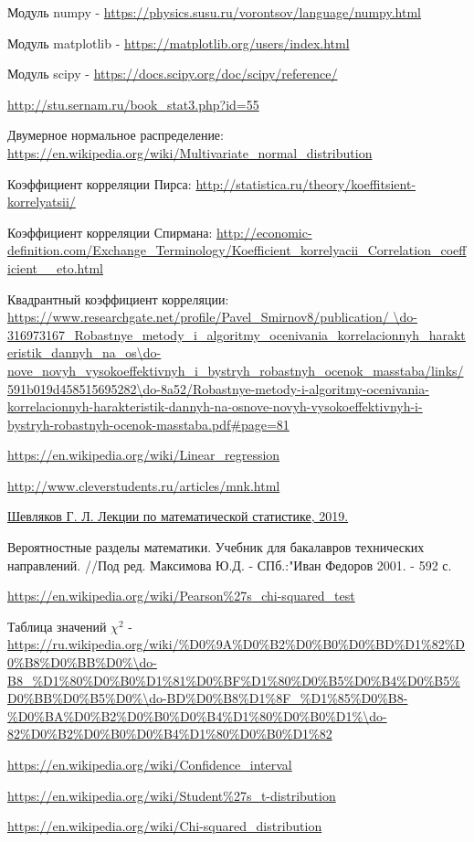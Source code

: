 \documentclass[12pt]{report}
\begin{document}
\begin{thebibliography}{}
	Модуль numpy  -  
	\url{https://physics.susu.ru/vorontsov/language/numpy.html}
    
    Модуль matplotlib - 
	\url{https://matplotlib.org/users/index.html}
    
    Модуль scipy - 
    \url{https://docs.scipy.org/doc/scipy/reference/}
    
    \url{http://stu.sernam.ru/book\_stat3.php?id=55}
    
	Двумерное нормальное распределение:\\
	\url{https://en.wikipedia.org/wiki/Multivariate\_normal\_distribution}
	
	Коэффициент корреляции Пирса: 
	\url{http://statistica.ru/theory/koeffitsient-korrelyatsii/}
	
	Коэффициент корреляции Спирмана: 
	\url{http://economic-definition.com/Exchange\_Terminology/Koefficient\_korrelyacii\_Correlation\_coefficient\_\_eto.html}
	
	 Квадрантный коэффициент корреляции: 
	\url{https://www.researchgate.net/profile/Pavel\_Smirnov8/publication/		\do-316973167\_Robastnye\_metody\_i\_algoritmy\_ocenivania\_korrelacionnyh\_harakteristik\_dannyh\_na\_os\do-	nove\_novyh\_vysokoeffektivnyh\_i\_bystryh\_robastnyh\_ocenok\_masstaba/links/591b019d458515695282\do-8a52/Robastnye-metody-i-algoritmy-ocenivania-korrelacionnyh-harakteristik-dannyh-na-osnove-novyh-vysokoeffektivnyh-i-bystryh-robastnyh-ocenok-masstaba.pdf\#page=81}

    
    \url{https://en.wikipedia.org/wiki/Linear\_regression}

	\url{http://www.cleverstudents.ru/articles/mnk.html}

	\url{Шевляков Г. Л. Лекции по математической статистике, 2019.}

	Вероятностные разделы математики. Учебник для бакалавров технических направлений. //Под ред. Максимова Ю.Д. - СПб.:"Иван Федоров 2001. - 592 с.


	\url{https://en.wikipedia.org/wiki/Pearson\%27s\_chi-squared\_test}

	Таблица значений $\chi^2$ -  
	\url{https://ru.wikipedia.org/wiki/\%D0\%9A\%D0\%B2\%D0\%B0\%D0\%BD\%D1\%82\%D0\%B8\%D0\%BB\%D0\%\do-B8\_\%D1\%80\%D0\%B0\%D1\%81\%D0\%BF\%D1\%80\%D0\%B5\%D0\%B4\%D0\%B5\%D0\%BB\%D0\%B5\%D0\%\do-BD\%D0\%B8\%D1\%8F\_\%D1\%85\%D0\%B8-\%D0\%BA\%D0\%B2\%D0\%B0\%D0\%B4\%D1\%80\%D0\%B0\%D1\%\do-82\%D0\%B2\%D0\%B0\%D0\%B4\%D1\%80\%D0\%B0\%D1\%82}

	\url{https://en.wikipedia.org/wiki/Confidence\_interval}

	\url{https://en.wikipedia.org/wiki/Student\%27s\_t-distribution}

	\url{https://en.wikipedia.org/wiki/Chi-squared\_distribution}

\end{thebibliography}
\end{document}
